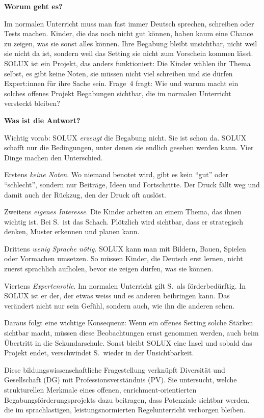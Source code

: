 \documentclass[ngerman, a4paper]{article}
\begin{document}
\begin{frageantwort4}
\textbf{Worum geht es?}

Im normalen Unterricht muss man fast immer Deutsch sprechen, schreiben
oder Tests machen. Kinder, die das noch nicht gut können, haben kaum
eine Chance zu zeigen, was sie sonst alles können. Ihre Begabung bleibt
unsichtbar, nicht weil sie nicht da ist, sondern weil das Setting sie
nicht zum Vorschein kommen lässt. SOLUX ist ein Projekt, das anders
funktioniert: Die Kinder wählen ihr Thema selbst, es gibt keine Noten,
sie müssen nicht viel schreiben und sie dürfen Expert:innen für ihre
Sache sein. Frage~4 fragt: Wie und warum macht ein solches offenes
Projekt Begabungen sichtbar, die im normalen Unterricht versteckt bleiben?

\medskip
\textbf{Was ist die Antwort?}

Wichtig vorab: SOLUX \emph{erzeugt} die Begabung nicht. Sie ist schon
da. SOLUX schafft nur die Bedingungen, unter denen sie endlich gesehen
werden kann. Vier Dinge machen den Unterschied.

Erstens \emph{keine Noten}. Wo niemand benotet wird, gibt es kein
\enquote{gut} oder \enquote{schlecht}, sondern nur Beiträge, Ideen und
Fortschritte. Der Druck fällt weg und damit auch der Rückzug, den der
Druck oft auslöst.

Zweitens \emph{eigenes Interesse}. Die Kinder arbeiten an einem Thema,
das ihnen wichtig ist. Bei S.~ist das Schach. Plötzlich wird sichtbar,
dass er strategisch denken, Muster erkennen und planen kann.

Drittens \emph{wenig Sprache nötig}. SOLUX kann man mit Bildern, Bauen,
Spielen oder Vormachen umsetzen. So müssen Kinder, die Deutsch erst
lernen, nicht zuerst sprachlich aufholen, bevor sie zeigen dürfen, was
sie können.

Viertens \emph{Expertenrolle}. Im normalen Unterricht gilt S.~als
förderbedürftig. In SOLUX ist er der, der etwas weiss und es anderen
beibringen kann. Das verändert nicht nur sein Gefühl, sondern auch,
wie ihn die anderen sehen.

Daraus folgt eine wichtige Konsequenz: Wenn ein offenes Setting solche
Stärken sichtbar macht, müssen diese Beobachtungen ernst genommen
werden, auch beim Übertritt in die Sekundarschule. Sonst bleibt SOLUX
eine Insel und sobald das Projekt endet, verschwindet S.~wieder in der
Unsichtbarkeit.
\end{frageantwort4}


Diese bildungswissenschaftliche Fragestellung verknüpft Diversität und Gesellschaft (DG)
mit Professionsverständnis (PV). Sie untersucht, welche strukturellen Merkmale eines
offenen, enrichment-orientierten Begabungsförderungsprojekts dazu beitragen, dass
Potenziale sichtbar werden, die im sprachlastigen, leistungsnormierten Regelunterricht
verborgen bleiben.
 
\end{document}
